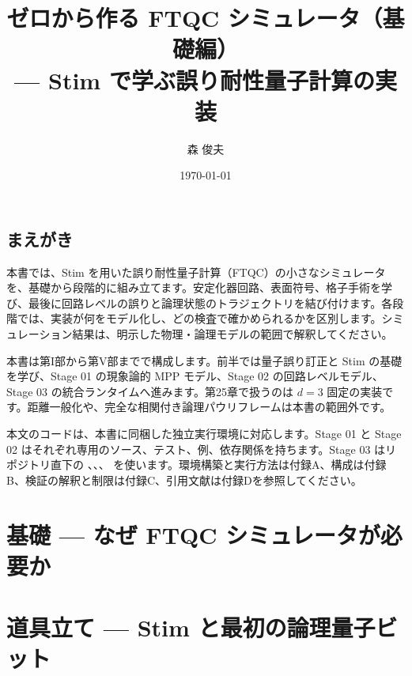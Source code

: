 \documentclass[book,openany,lualatex,paper={182mm,232mm},fontsize=10pt,line_length=41zw,number_of_lines=33]{jlreq}
\title{ゼロから作る FTQC シミュレータ（基礎編）\\— Stim で学ぶ誤り耐性量子計算の実装}
\author{森 俊夫}
\date{\today}
\begin{document}
\hypersetup{pageanchor=false}
\maketitle

\frontmatter
\hypersetup{pageanchor=true}
\setcounter{tocdepth}{1} %
\tableofcontents

\chapter*{まえがき}
本書では、Stim を用いた誤り耐性量子計算（FTQC）の小さなシミュレータを、基礎から段階的に組み立てます。安定化器回路、表面符号、格子手術を学び、最後に回路レベルの誤りと論理状態のトラジェクトリを結び付けます。各段階では、実装が何をモデル化し、どの検査で確かめられるかを区別します。シミュレーション結果は、明示した物理・論理モデルの範囲で解釈してください。

本書は第I部から第V部までで構成します。前半では量子誤り訂正と Stim の基礎を学び、Stage 01 の現象論的 MPP モデル、Stage 02 の回路レベルモデル、Stage 03 の統合ランタイムへ進みます。第25章で扱うのは $d=3$ 固定の実装です。距離一般化や、完全な相関付き論理パウリフレームは本書の範囲外です。

本文のコードは、本書に同梱した独立実行環境に対応します。Stage 01 と Stage 02 はそれぞれ専用のソース、テスト、例、依存関係を持ちます。Stage 03 はリポジトリ直下の 、、、 を使います。環境構築と実行方法は付録A、構成は付録B、検証の解釈と制限は付録C、引用文献は付録Dを参照してください。

\mainmatter

\part{基礎 — なぜ FTQC シミュレータが必要か}\label{part:foundations}






\part{道具立て — Stim と最初の論理量子ビット}\label{part:tools}
\end{document}

